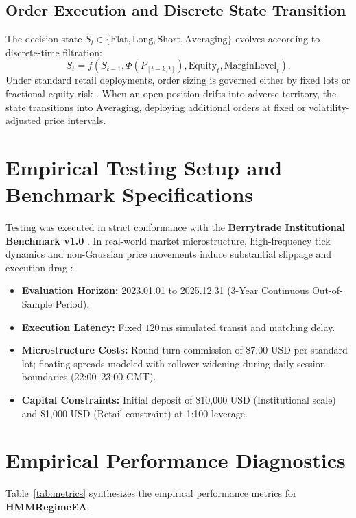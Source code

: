 \documentclass[11pt,a4paper]{article}
\begin{document}
\subsection{Order Execution and Discrete State Transition}
The decision state $S_t \in \{\text{Flat}, \text{Long}, \text{Short}, \text{Averaging}\}$ evolves according to discrete-time filtration:
\begin{equation}
S_{t} = f(S_{t-1}, \Phi(P_{[t-k, t]}), \text{Equity}_t, \text{MarginLevel}_t).
\end{equation}
Under standard retail deployments, order sizing is governed either by fixed lots or fractional equity risk \cite{lopez2018advances, carhart1997persistence}. When an open position drifts into adverse territory, the state transitions into $\text{Averaging}$, deploying additional orders at fixed or volatility-adjusted price intervals.

\section{Empirical Testing Setup and Benchmark Specifications}
Testing was executed in strict conformance with the \textbf{Berrytrade Institutional Benchmark v1.0} \cite{artsu2026illusion}. In real-world market microstructure, high-frequency tick dynamics and non-Gaussian price movements induce substantial slippage and execution drag \cite{kyle1985continuous, amihud2002illiquidity, cont2001empirical, mandelbrot1963variation}:
\begin{itemize}
    \item \textbf{Evaluation Horizon:} 2023.01.01 to 2025.12.31 (3-Year Continuous Out-of-Sample Period).
    \item \textbf{Execution Latency:} Fixed $120\,\text{ms}$ simulated transit and matching delay.
    \item \textbf{Microstructure Costs:} Round-turn commission of \$7.00 USD per standard lot; floating spreads modeled with rollover widening during daily session boundaries (22:00--23:00 GMT).
    \item \textbf{Capital Constraints:} Initial deposit of \$10,000 USD (Institutional scale) and \$1,000 USD (Retail constraint) at 1:100 leverage.
\end{itemize}

\section{Empirical Performance Diagnostics}
Table~\ref{tab:metrics} synthesizes the empirical performance metrics for \textbf{HMMRegimeEA}.
\end{document}
